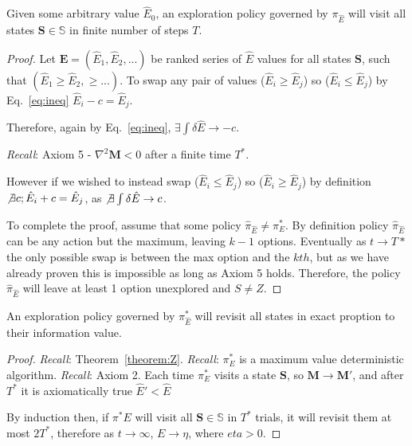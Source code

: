 \begin{theorem} \label{theorem:Z} 
	Given some arbitrary value $\hat E_0$, an exploration policy governed by $\pi_{\hat E}$ will visit all states $\mathbf{S} \in \mathbb{S}$ in finite number of steps $T$.
\end{theorem}
\begin{proof}
	Let $\mathbf{E} = (\hat E_1, \hat E_2, ...)$ be ranked series of $\hat E$ values for all states $\mathbf{S}$, such that $(\hat E_1 \geq \hat E_2, \geq ...)$. To swap any pair of values ($\hat E_i \geq \hat E_j$) so ($\hat E_i \leq \hat E_j$) by Eq.~\ref{eq:ineq} $\hat E_i - c = \hat E_j$. 
	
	Therefore, again by Eq.~\ref{eq:ineq}, $\exists \int \delta \hat E \rightarrow -c$. 
	
	\textit{Recall}: Axiom 5 - $\nabla^2 \mathbf{M} < 0$ after a finite time $T^*$.
	
	However if we wished to instead swap ($\hat E_i \leq \hat E_j$) so ($\hat E_i \geq \hat E_j$) by definition $\not \exists c; \hat E_i + c = \hat E_j$, as $\not \exists \int \delta \hat E \rightarrow c$. 
	
	To complete the proof, assume that some policy $\hat \pi_{\hat E} \neq \pi^*_E$. By definition policy $\hat \pi_{\hat E}$ can be any action but the maximum, leaving $k-1$ options. Eventually as $t \rightarrow T*$ the only possible swap is between the max option and the $kth$, but as we have already proven this is impossible as long as Axiom 5 holds. Therefore, the policy $\hat \pi_{\hat E}$ will leave at least 1 option unexplored and $S \neq Z$. 
\end{proof}

\begin{theorem}[[Efficient exploration] \label{theorem:convergence} 
	An exploration policy governed by $\pi^*_{\hat E}$ will revisit all states in exact proption to their information value.
\end{theorem}
\begin{proof}
    \textit{Recall}: Theorem~\ref{theorem:Z}.
    \textit{Recall}: $\pi^*_E$ is a maximum value deterministic algorithm.
	\textit{Recall}: Axiom 2. Each time $\pi^*_E$ visits a state $\mathbf{S}$, so $\mathbf{M} \rightarrow \mathbf{M}'$, and after $T^*$ it is axiomatically true $\hat{E}' < \hat E$
	
	By induction then, if $\pi^*E$ will visit all $\mathbf{S} \in \mathbb{S}$ in $T^*$ trials, it will revisit them at most $2T^*$, therefore as $t \rightarrow \infty$, $E \rightarrow \eta$, where $eta > 0$. 
\end{proof}

